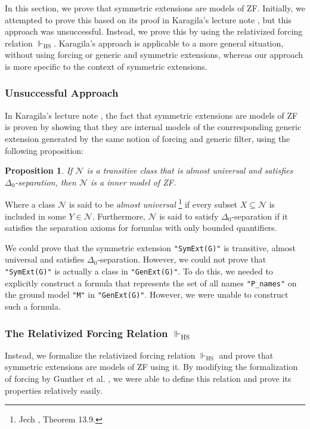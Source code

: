 \documentclass{report}
\newtheorem{prop}[thm]{Proposition}
\begin{document}
In this section, we prove that symmetric extensions are models of ZF.
Initially, we attempted to prove this based on its proof in Karagila's lecture note \cite{karagila},
but this approach was unsuccessful.
Instead, we prove this by using the relativized forcing relation $\Vdash_{\mathrm{HS}}$.
Karagila's approach is applicable to a more general situation,
without using forcing or generic and symmetric extensions,
whereas our approach is more specific to the context of symmetric extensions.


\subsubsection{Unsuccessful Approach}

In Karagila's lecture note \cite{karagila},
the fact that symmetric extensions are models of ZF is proven by showing that 
they are internal models of the conrresponding generic extension
generated by the same notion of forcing and generic filter,
using the following proposition:

\begin{prop}
If $\mathcal{N}$ is a transitive class that is almost universal and satisfies $\Delta_0$-separation, 
then $\mathcal{N}$ is a inner model of ZF.
\end{prop}

Where a class $\mathcal{N}$ is said to be \emph{almost universal} 
\footnote{Jech \cite{jech_set_theory}, Theorem 13.9.} 
 if every subset $X \subseteq \mathcal{N}$ is included in some $Y \in \mathcal{N}$.
Furthermore, $\mathcal{N}$ is said to satisfy $\Delta_0$-separation if it satisfies the separation axioms for formulas with only bounded quantifiers.

We could prove that the symmetric extension \texttt{"SymExt(G)"} is transitive, almost universal and satisfies $\Delta_0$-separation.
However, we could not prove that \texttt{"SymExt(G)"} is actually a class in \texttt{"GenExt(G)"}.
To do this, we needed to explicitly construct a formula that represents the set of all names \texttt{"P\_names"} on the ground model \texttt{"M"} in \texttt{"GenExt(G)"}.
However, we were unable to construct such a formula.


\subsubsection{The Relativized Forcing Relation $\Vdash_{\mathrm{HS}}$}
Instead, we formalize the relativized forcing relation $\Vdash_{\mathrm{HS}}$ and prove that symmetric extensions are models of ZF using it.
By modifying the formalization of forcing by Gunther et al. \cite{gunther_forcing}, 
we were able to define this relation and prove its properties relatively easily.
\end{document}

